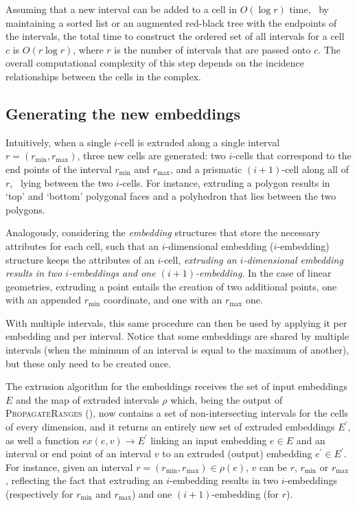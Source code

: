Assuming that a new interval can be added to a cell in $O(\log r)$ time, \eg\ by maintaining a sorted list or an augmented red-black tree with the endpoints of the intervals, the total time to construct the ordered set of all intervals for a cell $c$ is $O(r \log r)$, where $r$ is the number of intervals that are passed onto $c$.
The overall computational complexity of this step depends on the incidence relationships between the cells in the complex.

\subsection{Generating the new embeddings}
\label{ss:embeddings}

Intuitively, when a single $i$-cell is extruded along a single interval $r = (r_{\min}, r_{\max})$, three new cells are generated: two $i$-cells that correspond to the end points of the interval $r_{\min}$ and $r_{\max}$, and a prismatic $(i+1)$-cell along all of $r$, \ie\ lying between the two $i$-cells.
For instance, extruding a polygon results in `top' and `bottom' polygonal faces and a polyhedron that lies between the two polygons.

Analogously, considering the \emph{embedding} structures that store the necessary attributes for each cell, such that an $i$-dimensional embedding ($i$-embedding) structure keeps the attributes of an $i$-cell, \emph{extruding an $i$-dimensional embedding results in two $i$-embeddings and one $(i+1)$-embedding}.
In the case of linear geometries, extruding a point entails the creation of two additional points, one with an appended $r_{\min}$ coordinate, and one with an $r_{\max}$ one.

With multiple intervals, this same procedure can then be used by applying it per embedding and per interval.
Notice that some embeddings are shared by multiple intervals (when the minimum of an interval is equal to the maximum of another), but these only need to be created once.

The extrusion algorithm for the embeddings receives the set of input embeddings $E$ and the map of extruded intervals $\rho$ which, being the output of \textsc{PropagateRanges} (), now contains a set of non-intersecting intervals for the cells of every dimension, and it returns an entirely new set of extruded embeddings $E^{\prime}$, as well a function $ex(e, v) \rightarrow E^\prime$ linking an input embedding $e \in E$ and an interval or end point of an interval $v$ to an extruded (output) embedding $e^{\prime} \in E^{\prime}$.
For instance, given an interval $r = (r_{\min}, r_{\max}) \in \rho(e)$, $v$ can be $r$, $r_{\min}$ or $r_{\max}$, reflecting the fact that extruding an $i$-embedding results in two $i$-embeddings (respectively for $r_{\min}$ and $r_{\max}$) and one $(i+1)$-embedding (for $r$).

